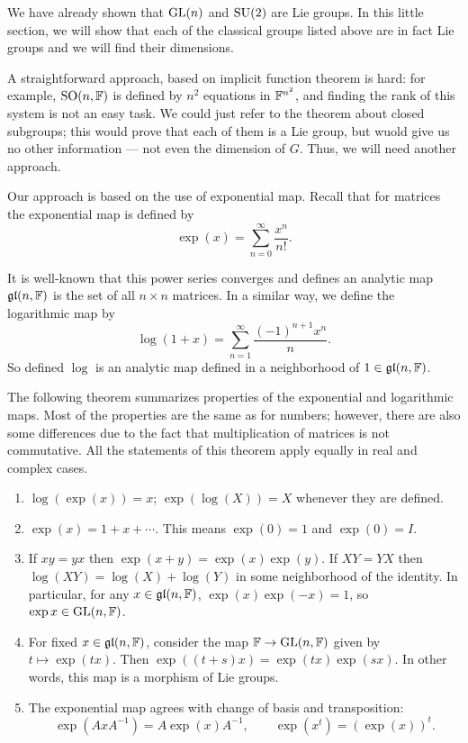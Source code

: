 We have already shown that $\mathrm{GL}(n)$ and $\mathrm{SU}(2)$ are Lie groups. In this
little section, we will show that each of the classical groups listed above
are in fact Lie groups and we will find their dimensions.

A straightforward approach, based on implicit function theorem is hard: for
example, $\mathrm{SO}(n,\mathbb{F})$ is defined by $n^2$ equations in $\mathbb{F}^{n^2}$, and
finding the rank of this system is not an easy task. We could just refer to
the theorem about closed subgroups; this would prove that each of them is a
Lie group, but wuold give us no other information --- not even the
dimension of $G$. Thus, we will need another approach.

Our approach is based on the use of exponential map. Recall that for
matrices the exponential map is defined by
\[
  \exp(x)=\sum_{n=0}^\infty \frac{x^n}{n!}.
\]

It is well-known that this power series converges and defines an analytic
map $\mathfrak{gl}(n,\mathbb{F})$ is the set of all $n\times n$ matrices. In a similar
way, we define the logarithmic map by
\[
  \log(1+x)=\sum_{n=1}^\infty\frac{(-1)^{n+1}x^n}{n}.
\]
So defined $\log$ is an analytic map defined in a neighborhood of
$1\in\mathfrak{gl}(n,\mathbb{F})$.

The following theorem summarizes properties of the exponential and
logarithmic maps. Most of the properties are the same as for numbers;
however, there are also some differences due to the fact that
multiplication of matrices is not commutative. All the statements of this
theorem apply equally in real and complex cases.

\begin{theorem}
  \hfill
  \begin{enumerate}[label=\textnormal{(\arabic*)}]
  \item $\log(\exp(x))=x$; $\exp(\log(X))=X$ whenever they are defined.
  \item $\exp(x)=1+x+\cdots$. This means $\exp(0)=1$ and $\exp(0)=I$.
  \item If $xy=yx$ then $\exp(x+y)=\exp(x)\exp(y)$. If $XY=YX$ then
    $\log(XY)=\log(X)+\log(Y)$ in some neighborhood of the identity. In
    particular, for any $x\in\mathfrak{gl}(n,\mathbb{F})$, $\exp(x)\exp(-x)=1$, so
    $\exp x\in\mathrm{GL}(n,\mathbb{F})$.
  \item For fixed $x\in\mathfrak{gl}(n,\mathbb{F})$, consider the map
    $\mathbb{F}\to\mathrm{GL}(n,\mathbb{F})$ given by $t\mapsto\exp(tx)$. Then
    $\exp((t+s)x)=\exp(tx)\exp(sx)$. In other words, this map is a morphism
    of Lie groups.
  \item The exponential map agrees with change of basis and transposition:
    \[
      \exp(AxA^{-1})=A\exp(x)A^{-1},\qquad \exp(x^t)=(\exp(x))^t.
    \]
  \end{enumerate}
\end{theorem}


